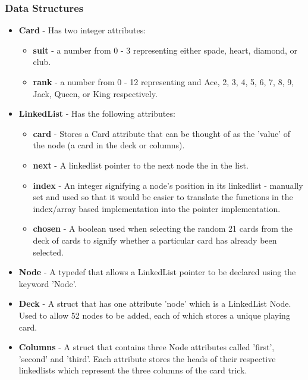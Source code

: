 \documentclass[11]{article}
\begin{document}
			\subsubsection{Data Structures}
				\begin{itemize}
					\item \textbf{Card} - Has two integer attributes:
						\begin{itemize}
							\item \textbf{suit} - a number from 0 - 3 representing either spade, heart, diamond, or club.
							\item \textbf{rank} - a number from 0 - 12 representing and Ace, 2, 3, 4, 5, 6, 7, 8, 9, Jack, Queen, or King respectively.
						\end{itemize}
						
					\item \textbf{LinkedList} - Has the following attributes: 
						\begin{itemize}
							\item \textbf{card} - Stores a Card attribute that can be thought of as the 'value' of the node (a card in the deck or columns).
							\item \textbf{next} - A linkedlist pointer to the next node the in the list.
							\item \textbf{index} - An integer signifying a node's position in its linkedlist - manually set and used so that it would be easier to translate the functions in the index/array based implementation into the pointer implementation.
							
							\item \textbf{chosen} - A boolean used when selecting the random 21 cards from the deck of cards to signify whether a particular card has already been selected.
						\end{itemize}
						
					\item \textbf{Node} - A typedef that allows a LinkedList pointer to be declared using the keyword 'Node'.										
					
					\item \textbf{Deck} - A struct that has one attribute 'node' which is a LinkedList Node. Used to allow 52 nodes to be added, each of which stores a unique playing card.
					
					\item \textbf{Columns} - A struct that contains three Node attributes called 'first', 'second' and 'third'. Each attribute stores the heads of their respective linkedlists which represent the three columns of the card trick.
				\end{itemize}
				
\end{document}
